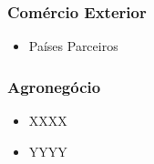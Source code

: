 \documentclass[12pt,aspectratio=169]{beamer}
\begin{document}
\begin{frame}
	\frametitle{Comércio Exterior}
	\begin{itemize}
		\item Países Parceiros
	\end{itemize}
	
	\begin{figure}%
		\centering
		\qquad
	\end{figure}
\end{frame}

\begin{frame}
	\frametitle{Agronegócio}
	\begin{itemize}
		\item XXXX
		\item YYYY
	\end{itemize}
\end{frame}
\end{document}
